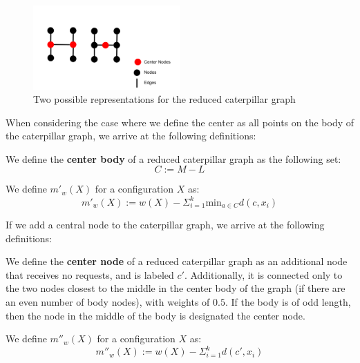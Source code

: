\begin{figure}[H]
    \centering
    \includegraphics[width=0.5\textwidth]{images/center.png}
    \caption{Two possible representations for the reduced caterpillar graph}
    \label{fig:smallcat}
\end{figure}

When considering the case where we define the center as all points on the body of the caterpillar graph, we arrive at the following definitions:

\begin{definition}
     We define the \textbf{center body} of a reduced caterpillar graph as the following set:
        \begin{equation*}
            C := M - L
        \end{equation*}
\end{definition}

\begin{definition}
    We define $m'_w(X)$ for a configuration $X$ as:
    \begin{equation*}
        m'_w(X) := w(X) - \Sigma_{i=1} ^ k \mathrm{min}_{a \in C} d(c, x_i)
    \end{equation*}
\end{definition}

If we add a central node to the caterpillar graph, we arrive at the following definitions:

\begin{definition}
    We define the \textbf{center node} of a reduced caterpillar graph as an additional node that receives no requests, and is labeled $c'$. Additionally, it is connected only to the two nodes closest to the middle in the center body of the graph (if there are an even number of body nodes), with weights of $0.5$. If the body is of odd length, then the node in the middle of the body is designated the center node.
\end{definition}

\begin{definition}
    We define $m''_w(X)$ for a configuration $X$ as:
    \begin{equation*}
        m''_w(X) := w(X) - \Sigma_{i=1} ^ k d(c', x_i)
    \end{equation*}
\end{definition}

